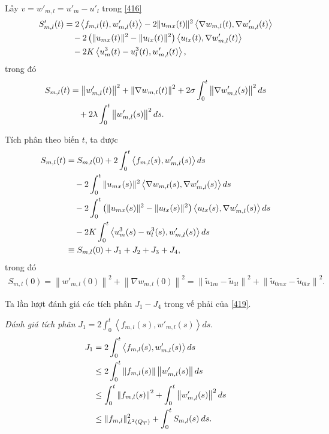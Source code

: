 \documentclass[12pt,a4paper]{article}
\theoremstyle{definition}
\theoremstyle{definition}
\begin{document}
Lấy $v = w'_{m,l} = u'_m - u'_l$ trong \eqref{416}
\begin{align}
    S'_{m,l}(t) &= 2 \left<f_{m,l}(t), w'_{m,l}(t)\right> - 2 \|u_{mx}(t)\|^2 \left<\nabla w_{m,l}(t), \nabla w'_{m,l}(t)\right> \\
    &\quad - 2 \left(\|u_{mx}(t)\|^2 - \|u_{lx}(t)\|^2\right) \left< u_{lx}(t), \nabla w'_{m,l}(t)\right> \notag \\
    &\quad - 2K \left< u^3_m(t) - u^3_l(t), w'_{m,l}(t)\right>, \notag
\end{align}
trong đó
\begin{align}
    S_{m,l}(t)
    &= \left\|w'_{m,l}(t)\right\|^2
    + \left\|\nabla w_{m,l}(t)\right\|^2
    + 2\sigma \int_0^t \left\|\nabla w'_{m,l}(s)\right\|^2 ds \\
    &\quad + 2\lambda \int_0^t \left\|w'_{m,l}(s)\right\|^2 ds. \notag
\end{align}

Tích phân theo biến $t$, ta được
\begin{align} \label{419}
    S_{m,l}(t)
    &= S_{m,l}(0)
    + 2 \int_0^t \left<f_{m,l}(s), w'_{m,l}(s)\right> ds \\
    &\quad - 2 \int_0^t \|u_{mx}(s)\|^2 \left<\nabla w_{m,l}(s), \nabla w'_{m,l}(s)\right> ds \notag \\
    &\quad - 2 \int_0^t \left(\|u_{mx}(s)\|^2 - \|u_{lx}(s)\|^2\right) \left< u_{lx}(s), \nabla w'_{m,l}(s)\right> ds \notag \\
    &\quad - 2K \int_0^t \left< u^3_m(s) - u^3_l(s), w'_{m,l}(s)\right> ds \notag \\
    &\equiv S_{m,l}(0) + J_1 + J_2 + J_3 + J_4, \notag 
\end{align}
trong đó
\begin{align}
    S_{m,l}(0) = \left\|w'_{m,l}(0)\right\|^2 + \left\|\nabla w_{m,l}(0)\right\|^2
    = \left\|\tilde{u}_{1m} - \tilde{u}_{1l}\right\|^2 + \left\|\tilde{u}_{0mx} - \tilde{u}_{0lx}\right\|^2.
\end{align}

Ta lần lượt đánh giá các tích phân $J_1-J_4$ trong vế phải của \eqref{419}.

\textit{Đánh giá tích phân} $\displaystyle J_1 = 2 \int_0^t \left<f_{m,l}(s), w'_{m,l}(s)\right> ds$.
\begin{align} \label{421}
    J_1 &= 2 \int_0^t \left<f_{m,l}(s), w'_{m,l}(s)\right> ds \\
    &\le 2 \int_0^t \left\|f_{m,l}(s)\right\| \left\|w'_{m,l}(s)\right\| ds \notag \\
    &\le \int_0^t \left\|f_{m,l}(s)\right\|^2 + \int_0^t \left\|w'_{m,l}(s)\right\|^2 ds \notag \\
    &\le \|f_{m,l}\|^2_{L^2(Q_T)} + \int_0^t S_{m,l}(s)\:ds. \notag 
\end{align}
\end{document}

